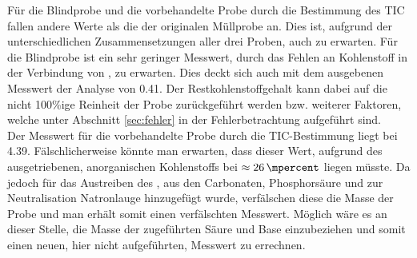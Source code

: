 Für die Blindprobe und die vorbehandelte Probe durch die Bestimmung des TIC fallen andere Werte als die der originalen Müllprobe an. Dies ist, aufgrund der unterschiedlichen Zusammensetzungen aller drei Proben, auch zu erwarten. Für die Blindprobe ist ein sehr geringer Messwert, durch das Fehlen an Kohlenstoff in der Verbindung von , zu erwarten. Dies deckt sich auch mit dem ausgebenen Messwert der Analyse von \SI{0,41}{\mpercent}. Der Restkohlenstoffgehalt kann dabei auf die nicht 100\%ige Reinheit der Probe zurückgeführt werden bzw. weiterer Faktoren, welche unter Abschnitt \ref{sec:fehler} in der Fehlerbetrachtung aufgeführt sind.\\
Der Messwert für die vorbehandelte Probe durch die TIC-Bestimmung liegt bei \SI{4,39}{\mpercent}. Fälschlicherweise könnte man erwarten, dass dieser Wert, aufgrund des ausgetriebenen, anorganischen Kohlenstoffs bei $\approx \SI{26}{\mpercent}$ liegen müsste. Da jedoch für das Austreiben des , aus den Carbonaten, Phosphorsäure und zur Neutralisation Natronlauge hinzugefügt wurde, verfälschen diese die Masse der Probe und man erhält somit einen verfälschten Messwert. Möglich wäre es an dieser Stelle, die Masse der zugeführten Säure und Base einzubeziehen und somit einen neuen, hier nicht aufgeführten, Messwert zu errechnen.
\vspace*{-3.5mm}
\renewcommand{\arraystretch}{1.2}
\begin{table}[h!]
	\centering
	\caption[Elementgehalte von Restabfall und ausgewählter Fraktionen]{Elementgehalte von Restabfall und ausgewählter Fraktionen \cite[S.11]{HansGunterRamke.}}
	\label{tab:tc_vergleich}
\end{table}
